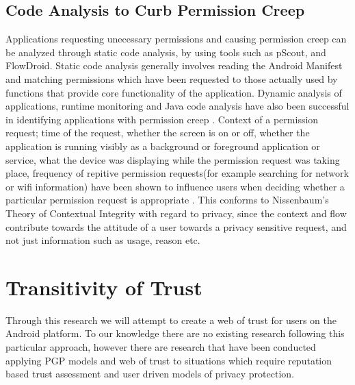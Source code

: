 \subsection{Code Analysis to Curb Permission Creep}
Applications requesting unecessary permissions and causing permission creep can be analyzed through static code analysis, by using tools such as pScout\cite{au2012pscout}, and FlowDroid\cite{arzt2014flowdroid}. Static code analysis generally involves reading the Android Manifest and matching permissions which have been requested to those actually used by functions that provide core functionality of the application. Dynamic analysis of applications, runtime monitoring and Java code analysis have also been successful in identifying applications with permission creep \cite{spreitzenbarth2013mobile}. Context of a permission request; time of the request, whether the screen is on or off, whether the application is running visibly as a background or foreground application or service, what the device was displaying while the permission request was taking place, frequency of repitive permission requests(for example searching for network or wifi information) have been shown to influence users when deciding whether a particular permission request is appropriate \cite{wijesekera2015android}. This conforms to Nissenbaum's Theory of Contextual Integrity\cite{nissenbaum2004privacy} with regard to privacy, since the context and flow contribute towards the attitude of a user towards a privacy sensitive request, and not just information such as usage, reason etc.

\section{Transitivity of Trust}
Through this research we will attempt to create a web of trust for users on the Android platform. To our knowledge there are no existing research following this particular approach, however there are research that have been conducted applying PGP models and web of trust to situations which require reputation based trust assessment and user driven models of privacy protection. 


